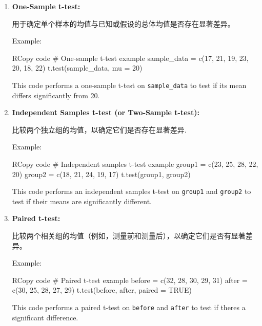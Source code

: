 \documentclass[
]{article}
\newenvironment{Shaded}{}{}
\newcommand{\NormalTok}[1]{#1}
\begin{document}
\begin{enumerate}
\def\labelenumi{\arabic{enumi}.}
\item
  \textbf{One-Sample t-test:}

  用于确定单个样本的均值与已知或假设的总体均值是否存在显著差异。

  Example:

\begin{Shaded}
\begin{Highlighting}[]
\NormalTok{RCopy code}
\NormalTok{\# One{-}sample t{-}test example}
\NormalTok{sample\_data = c(17, 21, 19, 23, 20, 18, 22)}
\NormalTok{t.test(sample\_data, mu = 20)}
\end{Highlighting}
\end{Shaded}

  This code performs a one-sample t-test on \texttt{sample\_data} to
  test if its mean differs significantly from 20.
\item
  \textbf{Independent Samples t-test (or Two-Sample t-test):}

  比较两个独立组的均值，以确定它们是否存在显著差异.

  Example:

\begin{Shaded}
\begin{Highlighting}[]
\NormalTok{RCopy code}
\NormalTok{\# Independent samples t{-}test example}
\NormalTok{group1 = c(23, 25, 28, 22, 20)}
\NormalTok{group2 = c(18, 21, 24, 19, 17)}
\NormalTok{t.test(group1, group2)}
\end{Highlighting}
\end{Shaded}

  This code performs an independent samples t-test on \texttt{group1}
  and \texttt{group2} to test if their means are significantly
  different.
\item
  \textbf{Paired t-test:}

  比较两个相关组的均值（例如，测量前和测量后），以确定它们是否有显著差异。

  Example:

\begin{Shaded}
\begin{Highlighting}[]
\NormalTok{RCopy code}
\NormalTok{\# Paired t{-}test example}
\NormalTok{before = c(32, 28, 30, 29, 31)}
\NormalTok{after = c(30, 25, 28, 27, 29)}
\NormalTok{t.test(before, after, paired = TRUE)}
\end{Highlighting}
\end{Shaded}

  This code performs a paired t-test on \texttt{before} and
  \texttt{after} to test if there\textquotesingle s a significant
  difference.
\end{enumerate}
\end{document}
